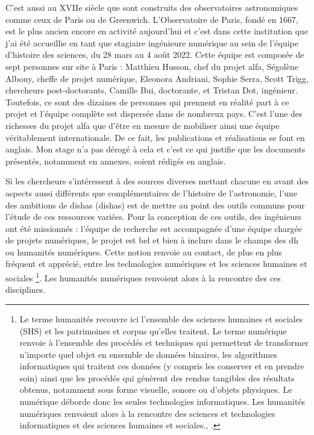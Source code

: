 C'est aussi au XVIIe siècle que sont construits des observatoires astronomiques comme ceux de Paris ou de Greenwich. L'Observatoire de Paris, fondé en 1667, est le plus ancien encore en activité aujourd'hui et c'est dans cette institution que j'ai été accueillie en tant que stagiaire ingénieure numérique au sein de l'équipe d'histoire des sciences, du 28 mars au 4 août 2022. Cette équipe est composée de sept personnes sur site à Paris : Matthieu Husson, chef du projet \acrshort{alfa}, Ségolène Albouy, cheffe de projet numérique, Eleonora Andriani, Sophie Serra, Scott Trigg, chercheurs post-doctorants, Camille Bui, doctorante,  et Tristan Dot, ingénieur. Toutefois, ce sont des dizaines de personnes qui prennent en réalité part à ce projet et l'équipe complète est dispersée dans de nombreux pays. C'est l'une des richesses du projet \acrshort{alfa} que d'être en mesure de mobiliser ainsi une équipe véritablement internationale. De ce fait, les publications et réalisations se font en anglais. Mon stage n'a pas dérogé à cela et c'est ce qui justifie que les documents présentés, notamment en annexes, soient rédigés en anglais. 

Si les chercheurs s'intéressent à des sources diverses mettant chacune en avant des aspects aussi différents que complémentaires de l'histoire de l'astronomie, l'une des ambitions de \acrshort{dishas} (\acrlong{dishas}) est de mettre au point des outils communs pour l'étude de ces ressources variées. Pour la conception de ces outils, des ingénieurs ont été missionnés : l'équipe de recherche est accompagnée d'une équipe chargée de projets numériques, le projet est bel et bien à inclure dans le champs des \acrlong{dh} ou humanités numériques. Cette notion renvoie au contact, de plus en plus fréquent et apprécié, entre les technologies numériques et les sciences humaines et sociales \footnote{\og{}Le terme \og{}humanités\fg{} recouvre ici l’ensemble des sciences humaines et sociales (SHS) et les patrimoines et corpus qu’elles traitent. Le terme \og{}numérique\fg{} renvoie à l’ensemble des procédés et techniques qui permettent de transformer n’importe quel objet en ensemble de données binaires, les algorithmes informatiques qui traitent ces données (y compris les conserver et en prendre soin) ainsi que les procédés qui génèrent des rendus tangibles des résultats obtenus, notamment sous forme visuelle, sonore ou d’objets physiques. Le numérique déborde donc les seules technologies informatiques. Les humanités numériques renvoient alors à la rencontre des sciences et technologies informatiques et des sciences humaines et sociales.\fg{}, \cite{vinckDefinitionHumanitesNumeriques2016}.}. Les humanités numériques renvoient alors à la rencontre des ces disciplines.  

